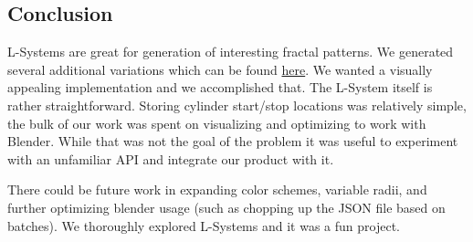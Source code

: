

\subsection{Conclusion}
L-Systems are great for generation of interesting fractal patterns. We
generated several additional variations which can be found
\href{https://sketchfab.com/macattackftw/models}{here}. We wanted a visually
appealing implementation and we accomplished that. The L-System itself is
rather straightforward. Storing cylinder start/stop locations was relatively
simple, the bulk of our work was spent on visualizing and optimizing to work
with Blender. While that was not the goal of the problem it was useful to
experiment with an unfamiliar API and integrate our product with it.

There could be future work in expanding color schemes, variable radii, and
further optimizing blender usage (such as chopping up the JSON file based on
batches). We thoroughly explored L-Systems and it was a fun project.

